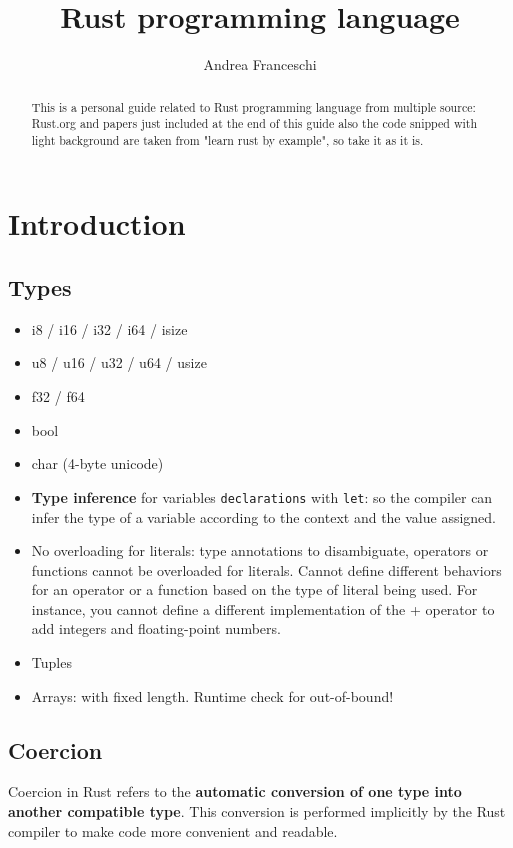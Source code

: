 \documentclass{article}
\title{Rust programming language}
\author{Andrea Franceschi}
\begin{document}
\maketitle

\begin{abstract}
This is a personal guide related to Rust programming language from multiple source: Rust.org and papers just included at the end of this guide also the code snipped with light background are taken from "learn rust by example", so take it as it is.
\end{abstract}

\section{Introduction}
\subsection{Types}
\begin{itemize}
    \item i8 / i16 / i32 / i64 / isize
    \item u8 / u16 / u32 / u64 / usize
    \item f32 / f64
    \item bool
    \item char (4-byte unicode)
    \item \textbf{Type inference} for variables \texttt{declarations} with \texttt{let}: so the compiler can infer the type of a variable according to the context and the value assigned.
    \item No overloading for literals: type annotations to disambiguate, operators or functions cannot be overloaded for literals. Cannot define different behaviors for an operator or a function based on the type of literal being used. For instance, you cannot define a different implementation of the + operator to add integers and floating-point numbers.
    \item Tuples
    \item Arrays: with fixed length. Runtime check for out-of-bound!
\end{itemize}

\subsection{Coercion}
Coercion in Rust refers to the \textbf{automatic conversion of one type into another compatible type}. This conversion is performed implicitly by the Rust compiler to make code more convenient and readable.
\end{document}
